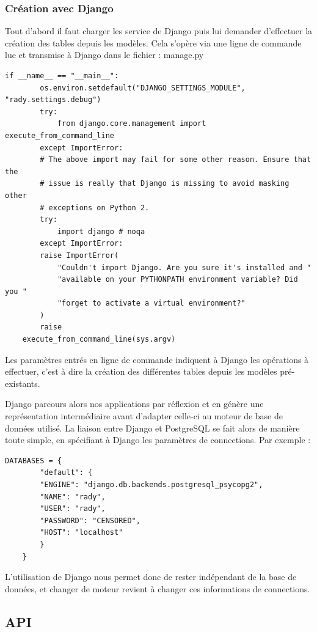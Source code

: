 \documentclass[french]{article}
\begin{document}
	\subsubsection{Création avec Django}	
	
	Tout d'abord il faut charger les service de Django puis lui demander d'effectuer la création des tables depuis les modèles. Cela s'opère via une ligne de commande lue et transmise à Django dans le fichier : manage.py
	
	\begin{lstlisting}[style=py]
	if __name__ == "__main__":
		os.environ.setdefault("DJANGO_SETTINGS_MODULE", "rady.settings.debug")
		try:
			from django.core.management import execute_from_command_line
		except ImportError:
		# The above import may fail for some other reason. Ensure that the
		# issue is really that Django is missing to avoid masking other
		# exceptions on Python 2.
		try:
			import django # noqa
		except ImportError:
		raise ImportError(
			"Couldn't import Django. Are you sure it's installed and "
			"available on your PYTHONPATH environment variable? Did you "
			"forget to activate a virtual environment?"
		)
		raise
	execute_from_command_line(sys.argv)	
	\end{lstlisting}
	
	Les paramètres entrés en ligne de commande indiquent à Django les opérations à effectuer, c'est à dire la création des différentes tables depuis les modèles pré-existants.
	
	Django parcours alors nos applications par réflexion et en génère une représentation intermédiaire avant d'adapter celle-ci au moteur de base de données utilisé. La liaison entre Django et PostgreSQL se fait alors de manière toute simple, en spécifiant à Django les paramètres de connections. Par exemple :
	
	\begin{lstlisting}[style=py]
	DATABASES = {
		"default": {
		"ENGINE": "django.db.backends.postgresql_psycopg2",
		"NAME": "rady",
		"USER": "rady",
		"PASSWORD": "CENSORED",
		"HOST": "localhost"
		}
	}
	\end{lstlisting}
	
	L'utilisation de Django nous permet donc de rester indépendant de la base de données, et changer de moteur revient à changer ces informations de connections.
	
	
	\subsection{API}
	
\end{document}
